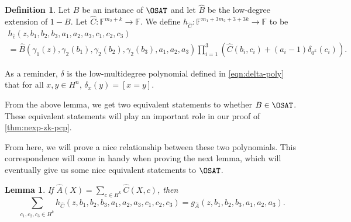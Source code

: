 \documentclass[english,12pt]{reedthesis}
\theoremstyle{plain}
\newtheorem{lemma}[lemma]{Lemma}
\theoremstyle{definition}
\newtheorem{defn}[defn]{Definition}
\theoremstyle{remark}
\begin{document}
\begin{defn}\label{def:h_c}
  Let $B$ be an instance of $\OSAT$ and let $\hat{B}$ be the low-degree
  extension of $1 - B$. Let $\hat{C}\colon \mathbb{F}^{m_{2} + k} \rightarrow \mathbb{F}$.
  We define
  $h_{\hat{C}}\colon \mathbb{F}^{m_{1} + 3m_{2} + 3 + 3k} \rightarrow \mathbb{F}$ to be
  \begin{multline}
    h_{\hat{c}}(z, b_{1}, b_{2}, b_{3}, a_{1}, a_{2}, a_{3}, c_{1}, c_{2}, c_{3}) \\ =
    \hat{B}(\gamma_{1}(z), \gamma_{2}(b_{1}), \gamma_{2}(b_{2}), \gamma_{2}(b_{3}), a_{1}, a_{2}, a_{3})
    \prod_{i=1}^{3}(\hat{C}(b_{i}, c_{i}) + (a_{i} - 1)\delta_{0^{k}}(c_{i})).
  \end{multline}
\end{defn}

As a reminder, $\delta$ is the low-multidegree polynomial defined in
\cref{eqn:delta-poly} that for all $x, y \in H^{n}$, $\delta_{x}(y) = [x = y]$.

From the above lemma, we get two equivalent statements to whether $B \in \OSAT$.
These equivalent statements will play an important role in our proof of
\cref{thm:nexp-zk-pcp}.

From here, we will prove a nice relationship between these two polynomials.
This correspondence will come in handy when proving the next lemma, which will
eventually give us some nice equivalent statements to $\OSAT$.

\begin{lemma}\label{lem:g_a-vs-h_c}
  If $\hat{A}(X) = \sum_{c \in H^{k}}\hat{C}(X, c)$, then
  \begin{equation}\label{eqn:g_a-vs-h_c}
    \sum_{c_{1}, c_{2}, c_{3} \in H^{k}}h_{\hat{C}}(z, b_{1}, b_{2}, b_{3}, a_{1}, a_{2}, a_{3}, c_{1}, c_{2}, c_{3})
    = g_{\hat{A}}(z, b_{1}, b_{2}, b_{3}, a_{1}, a_{2}, a_{3}).
  \end{equation}
\end{lemma}
\end{document}
